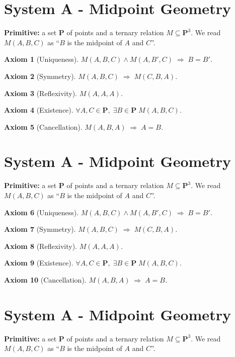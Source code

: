 \documentclass[]{article}
\newtheorem{axiom}{Axiom}
\begin{document}
\section*{System A - Midpoint Geometry}
\textbf{Primitive:} a set \(\mathbf{P}\) of points and a ternary relation
\(M \subseteq \mathbf{P}^3\).  We read \(M(A,B,C)\) as ``\(B\) is the midpoint
of \(A\) and \(C\)''.

\begin{axiom}[Uniqueness]
  \(M(A,B,C) \land M(A,B',C) \;\Longrightarrow\; B = B'\).
\end{axiom}
\begin{axiom}[Symmetry]
  \(M(A,B,C) \;\Longrightarrow\; M(C,B,A)\).
\end{axiom}
\begin{axiom}[Reflexivity]
  \(M(A,A,A)\).
\end{axiom}
\begin{axiom}[Existence]
  \(\forall A,C \in \mathbf{P},\; \exists B \in \mathbf{P}\; M(A,B,C)\).
\end{axiom}
\begin{axiom}[Cancellation]
  \(M(A,B,A) \;\Longrightarrow\; A = B\).
\end{axiom}

\section*{System A - Midpoint Geometry}
\textbf{Primitive:} a set \(\mathbf{P}\) of points and a ternary relation
\(M \subseteq \mathbf{P}^3\).  We read \(M(A,B,C)\) as ``\(B\) is the midpoint
of \(A\) and \(C\)''.

\begin{axiom}[Uniqueness]
  \(M(A,B,C) \land M(A,B',C) \;\Longrightarrow\; B = B'\).
\end{axiom}
\begin{axiom}[Symmetry]
  \(M(A,B,C) \;\Longrightarrow\; M(C,B,A)\).
\end{axiom}
\begin{axiom}[Reflexivity]
  \(M(A,A,A)\).
\end{axiom}
\begin{axiom}[Existence]
  \(\forall A,C \in \mathbf{P},\; \exists B \in \mathbf{P}\; M(A,B,C)\).
\end{axiom}
\begin{axiom}[Cancellation]
  \(M(A,B,A) \;\Longrightarrow\; A = B\).
\end{axiom}

\section*{System A - Midpoint Geometry}
\textbf{Primitive:} a set \(\mathbf{P}\) of points and a ternary relation
\(M \subseteq \mathbf{P}^3\).  We read \(M(A,B,C)\) as ``\(B\) is the midpoint
of \(A\) and \(C\)''.
\end{document}
